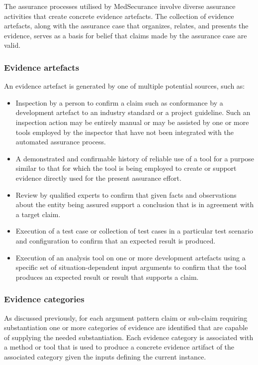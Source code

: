 \documentclass[12pt,twoside,a4paper]{article}
\begin{document}
The assurance processes utilised by MedSecurance involve diverse assurance activities that create concrete evidence artefacts. The collection of evidence artefacts, along with the assurance case that organizes, relates, and presents the evidence, serves as a basis for belief that claims made by the assurance case are valid.

\hypertarget{evidence-artefacts}{%
\subsubsection{Evidence artefacts}\label{evidence-artefacts}}

An evidence artefact is generated by one of multiple potential sources, such as:

\begin{itemize}
\item
  Inspection by a person to confirm a claim such as conformance by a development artefact to an industry standard or a project guideline. Such an inspection action may be entirely manual or may be assisted by one or more tools employed by the inspector that have not been integrated with the automated assurance process.
\item
  A demonstrated and confirmable history of reliable use of a tool for a purpose similar to that for which the tool is being employed to create or support evidence directly used for the present assurance effort.
\item
  Review by qualified experts to confirm that given facts and observations about the entity being assured support a conclusion that is in agreement with a target claim.
\item
  Execution of a test case or collection of test cases in a particular test scenario and configuration to confirm that an expected result is produced.
\item
  Execution of an analysis tool on one or more development artefacts using a specific set of situation-dependent input arguments to confirm that the tool produces an expected result or result that supports a claim.
\end{itemize}

\hypertarget{evidence-categories}{%
\subsubsection{Evidence categories}\label{evidence-categories}}

As discussed previously, for each argument pattern claim or sub-claim requiring substantiation one or more categories of evidence are identified that are capable of supplying the needed substantiation. Each evidence category is associated with a method or tool that is used to produce a concrete evidence artifact of the associated category given the inputs defining the current instance.
\end{document}
